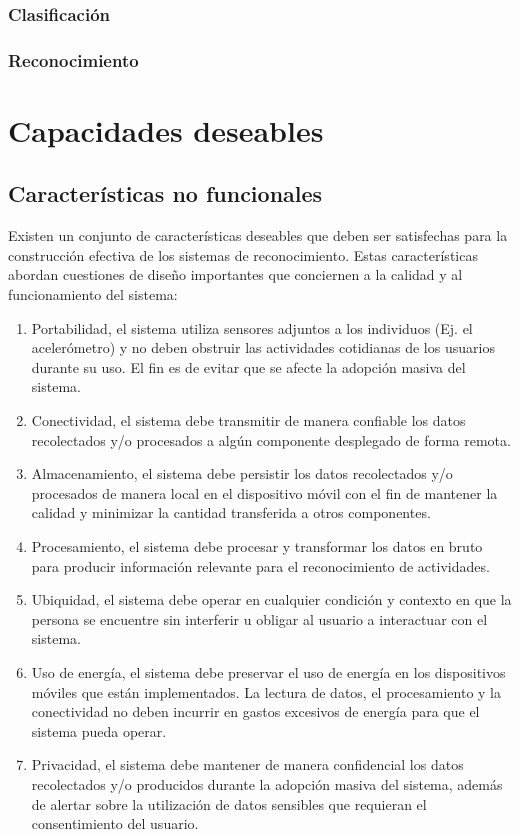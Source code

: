 \subsubsection{Clasificación}

\subsubsection{Reconocimiento}

\section{Capacidades deseables}

\subsection{Características no funcionales}

\label{ssec46:caracteristicas}Existen un conjunto de características
deseables que deben ser satisfechas para la construcción efectiva
de los sistemas de reconocimiento. Estas características abordan cuestiones
de diseño importantes que conciernen a la calidad y al funcionamiento
del sistema:
\begin{enumerate}
\item Portabilidad, el sistema utiliza sensores adjuntos a los individuos
(Ej. el acelerómetro) y no deben obstruir las actividades cotidianas
de los usuarios durante su uso. El fin es de evitar que se afecte
la adopción masiva del sistema. 
\item Conectividad, el sistema debe transmitir de manera confiable los datos
recolectados y/o procesados a algún componente desplegado de forma
remota. 
\item Almacenamiento, el sistema debe persistir los datos recolectados y/o
procesados de manera local en el dispositivo móvil con el fin de mantener
la calidad y minimizar la cantidad transferida a otros componentes.
\item Procesamiento, el sistema debe procesar y transformar los datos en
bruto para producir información relevante para el reconocimiento de
actividades.
\item Ubiquidad, el sistema debe operar en cualquier condición y contexto
en que la persona se encuentre sin interferir u obligar al usuario
a interactuar con el sistema.
\item Uso de energía, el sistema debe preservar el uso de energía en los
dispositivos móviles que están implementados. La lectura de datos,
el procesamiento y la conectividad no deben incurrir en gastos excesivos
de energía para que el sistema pueda operar.
\item Privacidad, el sistema debe mantener de manera confidencial los datos
recolectados y/o producidos durante la adopción masiva del sistema,
además de alertar sobre la utilización de datos sensibles que requieran
el consentimiento del usuario.
\end{enumerate}

